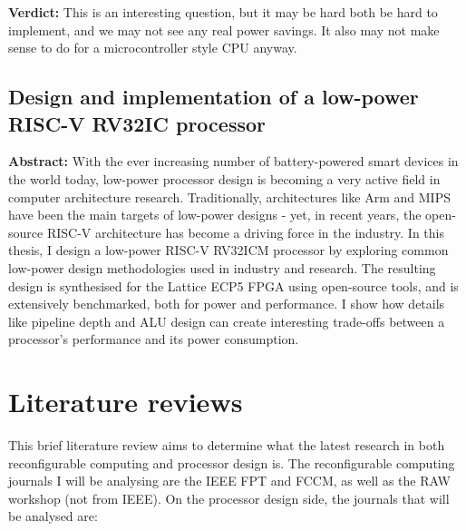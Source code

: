 \documentclass[12pt]{article}
\begin{document}
\textbf{Verdict:} This is an interesting question, but it may be hard both be hard to implement, and we
may not see any real power savings. It also may not make sense to do for a microcontroller style CPU anyway.

\subsection{Design and implementation of a low-power RISC-V RV32IC processor}
\textbf{Abstract:} With the ever increasing number of battery-powered smart devices in the world today,
low-power processor design is becoming a very active field in computer architecture research. Traditionally,
architectures like Arm and MIPS have been the main targets of low-power designs - yet, in recent years, the
open-source RISC-V architecture has become a driving force in the industry. In this thesis, I design a
low-power RISC-V RV32ICM processor by exploring common low-power design methodologies used in industry and
research. The resulting design is synthesised for the Lattice ECP5 FPGA using open-source tools, and is
extensively benchmarked, both for power and performance. I show how details like pipeline depth and ALU design
can create interesting trade-offs between a processor's performance and its power consumption.

%
%


\section{Literature reviews}
This brief literature review aims to determine what the latest research in both reconfigurable computing
and processor design is. The reconfigurable computing journals I will be analysing are the IEEE FPT 
and FCCM, as well as the RAW workshop (not from IEEE). On the processor design side, the journals that will
be analysed are: 
\end{document}
